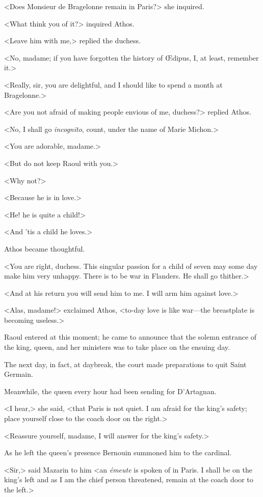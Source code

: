 <Does Monsieur de Bragelonne remain in Paris?> she inquired.

<What think you of it?> inquired Athos.

<Leave him with me,> replied the duchess.

<No, madame; if you have forgotten the history of Œdipus, I, at least, remember it.>

<Really, sir, you are delightful, and I should like to spend a month at Bragelonne.>

<Are you not afraid of making people envious of me, duchess?> replied Athos.

<No, I shall go \textit{incognito}, count, under the name of Marie Michon.>

<You are adorable, madame.>

<But do not keep Raoul with you.>

<Why not?>

<Because he is in love.>

<He! he is quite a child!>

<And 'tis a child he loves.>

Athos became thoughtful.

<You are right, duchess. This singular passion for a child of seven may some day make him very unhappy. There is to be war in Flanders. He shall go thither.>

<And at his return you will send him to me. I will arm him against love.>

<Alas, madame!> exclaimed Athos, <to-day love is like war—the breastplate is becoming useless.>

Raoul entered at this moment; he came to announce that the solemn entrance of the king, queen, and her ministers was to take place on the ensuing day.

The next day, in fact, at daybreak, the court made preparations to quit Saint Germain.

Meanwhile, the queen every hour had been sending for D'Artagnan.

<I hear,> she said, <that Paris is not quiet. I am afraid for the king's safety; place yourself close to the coach door on the right.>

<Reassure yourself, madame, I will answer for the king's safety.>

As he left the queen's presence Bernouin summoned him to the cardinal.

<Sir,> said Mazarin to him <an \textit{émeute} is spoken of in Paris. I shall be on the king's left and as I am the chief person threatened, remain at the coach door to the left.>

